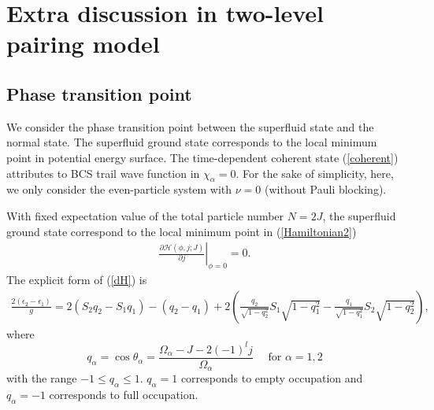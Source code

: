 \documentclass[11pt]{book} %
\begin{document}
\clearpage{\pagestyle{empty}\cleardoublepage}
\chapter{Extra discussion in two-level pairing model}

\section{Phase transition point}
\label{two-level}
We consider the phase transition point between the superfluid state and the normal state. The superfluid ground state corresponds to the local minimum point in potential energy surface. The time-dependent coherent state (\ref{coherent}) attributes to BCS trail wave function in $\chi_{\alpha}=0$. For the sake of simplicity, here, we only consider the even-particle system with $\nu=0$ (without Pauli blocking).

With fixed expectation value of the total particle number $N=2J$, the superfluid ground state correspond to the local minimum point in (\ref{Hamiltonian2})
\begin{align}
	\left. \frac{\partial\mathcal{H}(\phi,j;J)}{\partial j} \right|_{\phi=0}=0 .
	\label{dH}
\end{align}
The explicit form of (\ref{dH}) is
\begin{align}
	\frac{2(\epsilon_2-\epsilon_1)}{g} =
	2(S_2q_2-S_1q_1)-(q_2-q_1) + 2\left(\frac{q_2}{\sqrt{1-q_2^2}}S_1\sqrt{1-q_1^2}
	-\frac{q_1}{\sqrt{1-q_1^2}}S_2\sqrt{1-q_2^2}\right) ,
	\label{BCS_2level}
\end{align}
where 
\begin{equation}
	q_{\alpha}=\cos{\theta_{\alpha}} = \frac{\Omega_{\alpha} - J -2(-1)^l j}{\Omega_{\alpha}} 
	\quad \mbox{ for } \alpha=1,2
	\label{q_l}
\end{equation}
with the range $-1\le q_{\alpha}\le 1$. $q_{\alpha}=1$ corresponds to empty occupation and $q_{\alpha}=-1$ corresponds to full occupation. 
\end{document}
